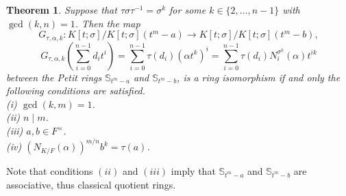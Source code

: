\documentclass{amsart}
\theoremstyle{plain}
\newtheorem{theorem}{Theorem}[section]
\theoremstyle{definition}
\numberwithin{equation}{section}
\numberwithin{figure}{section}
\begin{document}
 \begin{theorem}  \label{general_isomorphism_theorem2}
    Suppose that $\tau \sigma\tau^{-1}=\sigma^k$ for some $k\in \{2,\dots, n-1 \}$ with $\gcd (k, n)=1$.
    Then the map
 $$
  G_{\tau,\alpha,k}:K[t;\sigma]/K[t;\sigma](t^m-a)\to K[t;\sigma]/K[t;\sigma](t^m-b),
  $$
  $$
G_{\tau,\alpha,k} ( \sum_{i=0}^{n-1}d_it^i ) = \sum_{i=0}^{n-1}\tau(d_i) (\alpha t^k)^i  = \sum_{i=0}^{n-1} \tau(d_i) N_i^{\sigma^k}(\alpha) t^{ik}
$$
 between the Petit rings $\mathbb{S}_{t^m-a}$ and $\mathbb{S}_{t^m-b}$,
is a ring isomorphism if and only  the following conditions are satisfied.
\\ (i)  $\gcd(k,m)=1$.
\\ (ii)  $n\mid m$.
\\ (iii) $a, b\in F^\times$.
\\ (iv)
$(N_{K/F}(\alpha))^{m/n} b^k=\tau(a)$.
\end{theorem}

Note that conditions $(ii)$ and $(iii)$ imply that $\mathbb{S}_{t^m-a}$ and $\mathbb{S}_{t^m-b}$ are associative, thus classical quotient rings.
\end{document}
